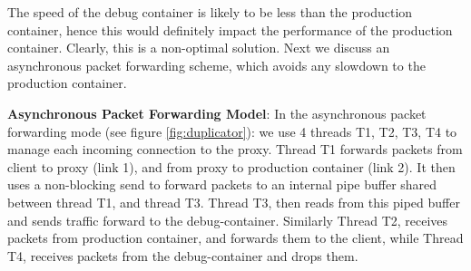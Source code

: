 The speed of the debug container is likely to be less than the production container, hence this would definitely impact the performance of the production container.
Clearly, this is a non-optimal solution. 
Next we discuss an asynchronous packet forwarding scheme, which avoids any slowdown to the production container.


\textbf{Asynchronous Packet Forwarding Model}: 
In the asynchronous packet forwarding mode (see figure \ref{fig:duplicator}): we use 4 threads T1, T2, T3, T4 to manage each incoming connection to the proxy.
Thread T1 forwards packets from client to proxy (link 1), and from proxy to production container (link 2). 
It then uses a non-blocking send to forward packets to an internal pipe buffer shared between thread T1, and thread T3. 
Thread T3, then reads from this piped buffer and sends traffic forward to the debug-container. 
Similarly Thread T2, receives packets from production container, and forwards them to the client, while Thread T4, receives packets from the debug-container and drops them.

